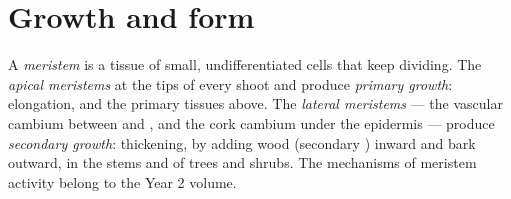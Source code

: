 \section{Growth and form}

\begin{definition}\label{def:b1:flowering-plant-organization:meristem}
A \emph{meristem} is a tissue of small, undifferentiated
cells that keep dividing. The \emph{apical meristems} at the tips of every shoot and  produce \emph{primary
growth}: elongation, and the primary tissues
above. The \emph{lateral meristems} ---
the vascular cambium between  and , and the cork cambium
under the epidermis --- produce \emph{secondary growth}: thickening, by adding wood (secondary ) inward and bark
outward, in the stems and  of trees and shrubs. The mechanisms of
meristem activity belong to the Year 2 volume.
\end{definition}

